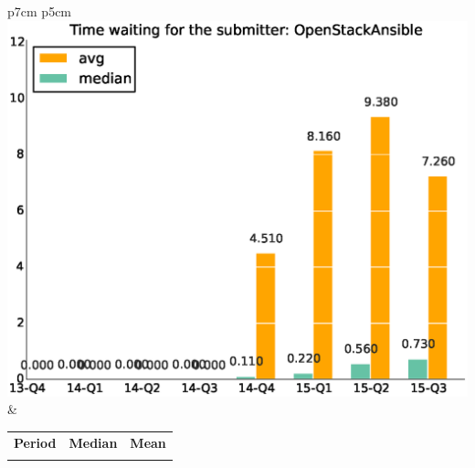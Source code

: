 \documentclass[a4wide,11pt]{article}
\begin{document}
\begin{tabular}{p{7cm} p{5cm}}
    \vspace{0pt} 
    \includegraphics[scale=.35]{figs/waiting4submitter_avgOpenStackAnsible.eps}
    & 
    \vspace{0pt}
    \begin{tabular}{l|r|r|}%
    \bfseries Period & \bfseries Median & \bfseries Mean %
    \csvreader[head to column names]{data/timewaiting4submitter_medianOpenStackAnsible.csv}{}%
    {\\ & \mediantime & \meantime}
    \end{tabular}
\end{tabular}
\end{document}
